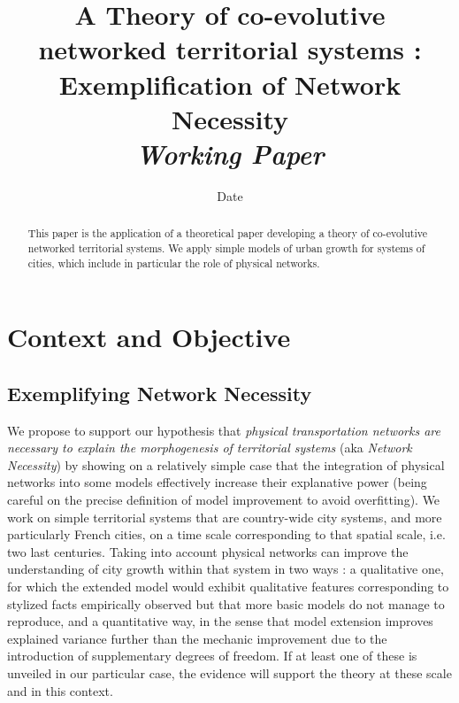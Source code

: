 


\title{A Theory of co-evolutive networked territorial systems : Exemplification of Network Necessity\bigskip\\
\textit{Working Paper}
}
\author{}
\date{Date}


\maketitle

\justify


\begin{abstract}
This paper is the application of a theoretical paper developing a theory of co-evolutive networked territorial systems. We apply simple models of urban growth for systems of cities, which include in particular the role of physical networks.
\end{abstract}



\section{Context and Objective}


\subsection{Exemplifying Network Necessity}


We propose to support our hypothesis that \textit{physical transportation networks are necessary to explain the morphogenesis of territorial systems} (aka \textit{Network Necessity}) by showing on a relatively simple case that the integration of physical networks into some models effectively increase their explanative power (being careful on the precise definition of model improvement to avoid overfitting). We work on simple territorial systems that are country-wide city systems, and more particularly French cities, on a time scale corresponding to that spatial scale, i.e. two last centuries. Taking into account physical networks can improve the understanding of city growth within that system in two ways : a qualitative one, for which the extended model would exhibit qualitative features corresponding to stylized facts empirically observed but that more basic models do not manage to reproduce, and a quantitative way, in the sense that model extension improves explained variance further than the mechanic improvement due to the introduction of supplementary degrees of freedom. If at least one of these is unveiled in our particular case, the evidence will support the theory at these scale and in this context.


